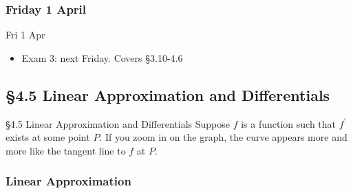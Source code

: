 \documentclass[cal1spr16Lectures.tex]{subfiles}
\begin{document}

\subsubsection{\bf Friday 1 April}

\begin{frame}[allowframebreaks]{Fri 1 Apr}
\begin{itemize}%
\item Exam 3: next Friday.  Covers \S 3.10-4.6 
\end{itemize}
\end{frame}

\subsection[4.5 Linear Approximation and Differentials]{\S 4.5 Linear Approximation and Differentials}

\begin{frame}{\S 4.5 Linear Approximation and Differentials}
\footnotesize
Suppose $f$ is a function such that $f^{\prime}$ exists at some point $P$.  If you zoom in on the graph, the curve appears more and more like the tangent line to $f$ at $P$.  

\end{frame}

\subsubsection{Linear Approximation}
\end{document}

